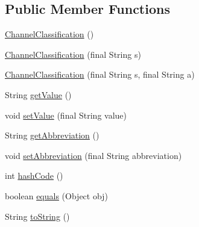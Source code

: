 \subsection*{Public Member Functions}
\begin{DoxyCompactItemize}
\item 
\hyperlink{classgov_1_1fnal_1_1ppd_1_1dd_1_1changer_1_1ChannelClassification_a2e255093510c2aa02327d5444757bf66}{Channel\-Classification} ()
\item 
\hyperlink{classgov_1_1fnal_1_1ppd_1_1dd_1_1changer_1_1ChannelClassification_a56c6ead212681a663a5c3c06bbc58491}{Channel\-Classification} (final String s)
\item 
\hyperlink{classgov_1_1fnal_1_1ppd_1_1dd_1_1changer_1_1ChannelClassification_ad0a87c979cb6ad8f63bf9cb0973dc6b8}{Channel\-Classification} (final String s, final String a)
\item 
String \hyperlink{classgov_1_1fnal_1_1ppd_1_1dd_1_1changer_1_1ChannelClassification_a3ecc2bd9c9c0cbc8df2fdb4c1e8dc794}{get\-Value} ()
\item 
void \hyperlink{classgov_1_1fnal_1_1ppd_1_1dd_1_1changer_1_1ChannelClassification_a975c43d435f30a41b3bcbafa54dd0d56}{set\-Value} (final String value)
\item 
String \hyperlink{classgov_1_1fnal_1_1ppd_1_1dd_1_1changer_1_1ChannelClassification_a587fe4a47a59ece62db68ea68d7a5e68}{get\-Abbreviation} ()
\item 
void \hyperlink{classgov_1_1fnal_1_1ppd_1_1dd_1_1changer_1_1ChannelClassification_a38f17aa3b3c05853fe24e25560ae6524}{set\-Abbreviation} (final String abbreviation)
\item 
int \hyperlink{classgov_1_1fnal_1_1ppd_1_1dd_1_1changer_1_1ChannelClassification_a6dbfc4ec668a08ef137a872514303232}{hash\-Code} ()
\item 
boolean \hyperlink{classgov_1_1fnal_1_1ppd_1_1dd_1_1changer_1_1ChannelClassification_a79f9f40e816a97f3043f096077836e96}{equals} (Object obj)
\item 
String \hyperlink{classgov_1_1fnal_1_1ppd_1_1dd_1_1changer_1_1ChannelClassification_a9b2bb357ea4192a8c2693fa66a0ce244}{to\-String} ()
\end{DoxyCompactItemize}

